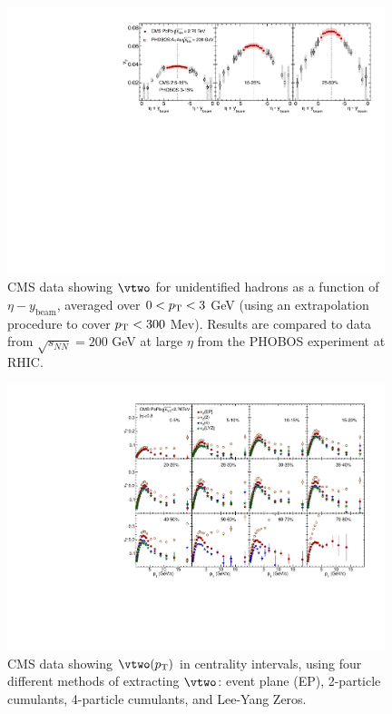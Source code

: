 \begin{figure}[!htb]
\begin{center}
\includegraphics[width=0.98\textwidth]{flowcorrelations_figs/v2_etashifted_3cen_PHOBOS.pdf}
\caption[]{
CMS data showing $\vtwo$ for unidentified hadrons as a function of $\eta - y_{\mathrm{beam}}$, averaged over $0 <\mbox{$p_{\mathrm{T}}$} < 3$ GeV (using an extrapolation procedure to cover $\mbox{$p_{\mathrm{T}}$} <300$ Mev).
Results are compared to data from $\sqrt{s_{NN}}=200$ GeV
at large $\eta$ from the PHOBOS experiment at RHIC.
}
\label{fig:pas:fc:limfrag}
\end{center}
\end{figure}

\begin{figure}[!htb]
\begin{center}
\includegraphics[width=0.98\textwidth]{flowcorrelations_figs/v2_pt_12cen_4methods.pdf}
\caption[]{
CMS data showing $\vtwo(\pT)$ in centrality intervals, using four different methods of extracting
$\vtwo$: event plane (EP), 2-particle cumulants, 4-particle cumulants, and Lee-Yang Zeros.
}
\label{fig:pas:fc:methods}
\end{center}
\end{figure}



